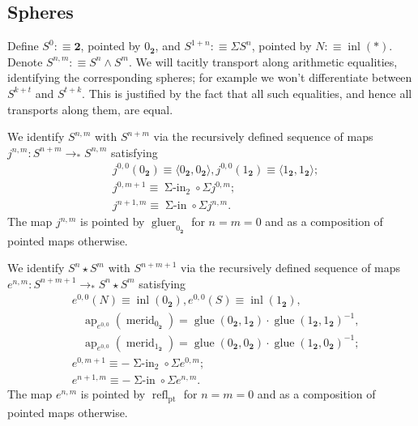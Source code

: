 \documentclass{amsart}
\theoremstyle{definition}
\newcommand{\ap}{\operatorname{ap}}
\newcommand{\refl}{\operatorname{refl}}
\newcommand{\inl}{\operatorname{inl}}
\newcommand{\glue}{\operatorname{glue}}
\newcommand{\gluer}{\operatorname{gluer}}
\newcommand{\merid}{\operatorname{merid}}
\newcommand{\bs}[1]{\mathrm{pt}_{#1}}
\newcommand{\pto}{\to_*}
\newcommand{\siin}{\operatorname{\Sigma-in}}
\newcommand{\s}{\mathbf{2}}
\newcommand{\join}{\star}
\begin{document}
\subsection{Spheres}\label{sec:spheres}

Define $S^0 :\equiv \s$, pointed by $0_{\s}$, and $S^{1+n} :\equiv \Sigma S^{n}$, pointed by $N :\equiv \inl(*)$.
\\
Denote $S^{n,m} :\equiv S^n \wedge S^m$. We will tacitly transport along arithmetic equalities, identifying the corresponding spheres; for example we won't differentiate between $S^{k+t}$ and $S^{t+k}$. This is justified by the fact that all such equalities, and hence all transports along them, are equal.

We identify $S^{n,m}$ with $S^{n+m}$ via the recursively defined sequence of maps $j^{n,m}: S^{n+m} \pto S^{n,m}$ satisfying
\begin{align*}
    & j^{0,0}(0_{\s}) \equiv \langle 0_{\s}, 0_{\s}\rangle, j^{0,0}(1_{\s}) \equiv \langle 1_{\s}, 1_{\s} \rangle; \\
    & j^{0, m+1} \equiv \siin_2 \circ \Sigma j^{0, m}; \\
    & j^{n+1, m} \equiv \siin \circ \Sigma j^{n,m}.
\end{align*}\label{j}
The map $j^{n,m}$ is pointed by $\gluer_{0_{\s}}$ for $n=m=0$ and as a composition of pointed maps otherwise.

We identify $S^{n} \join S^{m}$ with $S^{n+m+1}$ via the recursively defined sequence of maps $e^{n,m}: S^{n+m+1} \pto S^{n} \join S^{m}$ satisfying
\begin{align*}
    & e^{0,0}(N) \equiv \inl (0_{\s}), e^{0,0}(S) \equiv \inl(1_{\s}),\\
    & \> \> \> \> \ap_{e^{0,0}}(\merid_{0_{\s}})=\glue(0_{\s},1_{\s})\cdot \glue(1_{\s},1_{\s})^{-1},\\
    & \> \> \> \> \ap_{e^{0,0}}(\merid_{1_{\s}})=\glue(0_{\s},0_{\s})\cdot \glue(1_{\s},0_{\s})^{-1}; \\
    & e^{0, m+1} \equiv - \siin_2 \circ \Sigma e^{0,m}; \\
    & e^{n+1,m} \equiv - \siin \circ \Sigma e^{n,m}.
\end{align*}
The map $e^{n,m}$ is pointed by $\refl_{\bs{}}$ for $n=m=0$ and as a composition of pointed maps otherwise.
\end{document}
